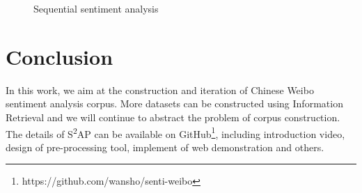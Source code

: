 \documentclass[runningheads]{llncs}
\begin{document}
\begin{figure}[ht]
\vspace{-0.5cm}  %
\centering  %
\caption{Sequential sentiment analysis}
\label{fig:sentiment-trend}
\end{figure}

\section{Conclusion}
 In this work, we aim at the construction and iteration of Chinese Weibo sentiment analysis corpus. More datasets can be constructed using Information Retrieval and we will continue to abstract the problem of corpus construction. The details of S\textsuperscript{2}AP can be available on GitHub\footnote{https://github.com/wansho/senti-weibo}, including introduction video, design of pre-processing tool, implement of web demonstration and others. 
 


\end{document}
